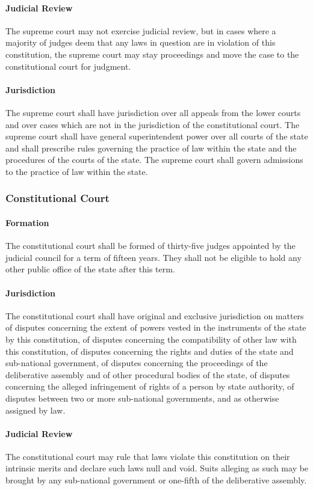 \documentclass{article}
\begin{document}
\paragraph{Judicial Review}
The supreme court may not exercise judicial review, but in cases where a majority of judges deem that any laws in question are in violation of this constitution, the supreme court may stay proceedings and move the case to the constitutional court for judgment.
\paragraph{Jurisdiction}
The supreme court shall have jurisdiction over all appeals from the lower courts and over cases which are not in the jurisdiction of the constitutional court. The supreme court shall have general superintendent power over all courts of the state and shall prescribe rules governing the practice of law within the state and the procedures of the courts of the state. The supreme court shall govern admissions to the practice of law within the state.
\subsubsection{Constitutional Court}
\paragraph{Formation}
The constitutional court shall be formed of thirty-five judges appointed by the judicial council for a term of fifteen years. They shall not be eligible to hold any other public office of the state after this term.
\paragraph{Jurisdiction}
The constitutional court shall have original and exclusive jurisdiction on matters of disputes concerning the extent of powers vested in the instruments of the state by this constitution, of disputes concerning the compatibility of other law with this constitution, of disputes concerning the rights and duties of the state and sub-national government, of disputes concerning the proceedings of the deliberative assembly and of other procedural bodies of the state, of disputes concerning the alleged infringement of rights of a person by state authority, of disputes between two or more sub-national governments, and as otherwise assigned by law.
\paragraph{Judicial Review}
The constitutional court may rule that laws violate this constitution on their intrinsic merits and declare such laws null and void. Suits alleging as such may be brought by any sub-national government or one-fifth of the deliberative assembly. 
\end{document}
